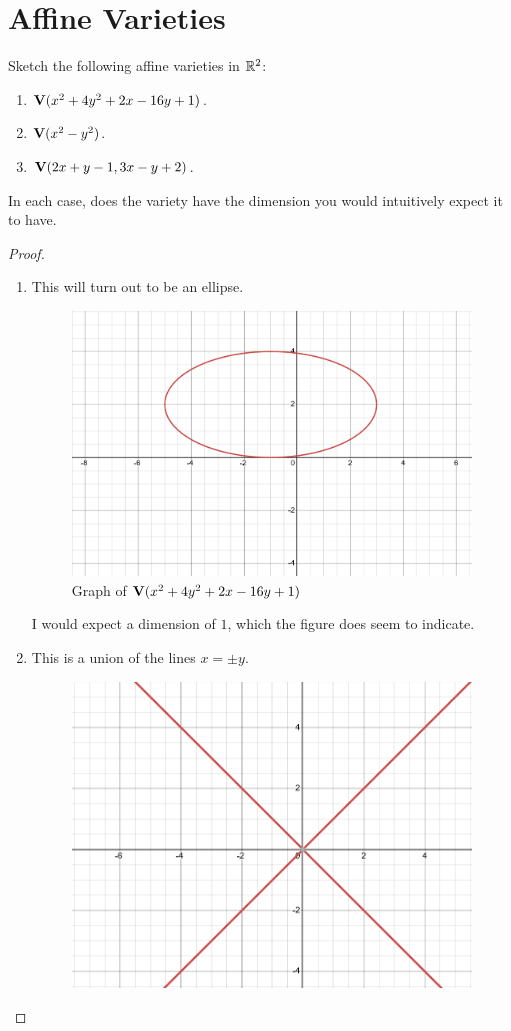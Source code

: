 \section{Affine Varieties}


\begin{exercise}{1}
Sketch the following affine varieties in $\mathbb{R}^2$:
\begin{enumerate}
    \item $\mathbf{V}(x^2 + 4y^2 + 2x - 16y + 1)$.
    \item $\mathbf{V}(x^2 - y^2)$.
    \item $\mathbf{V}(2x+y-1, 3x - y + 2)$.
\end{enumerate}
In each case, does the variety have the dimension you would intuitively expect it to have.
\end{exercise}
\begin{proof}
    \begin{enumerate}
        \item This will turn out to be an ellipse.
        \begin{figure}[H]
            \centering
            \includegraphics[width=0.5\linewidth]{cox-little-oshea/ch1/assets/sec1-2-ex1a.png}
     \caption{Graph of $\mathbf{V}(x^2 + 4y^2 + 2x - 16y + 1)$}
     \label{fig:sec1-2-ex1a}
        \end{figure}
        I would expect a dimension of $1$, which the figure does seem to indicate.
        \item This is a union of the lines $x=\pm y$.
        \begin{figure}[H]
            \centering
            \includegraphics[width=0.5\linewidth]{cox-little-oshea/ch1/assets/sec1-2-ex1b.png}

\end{figure}
\end{enumerate}
\end{proof}
